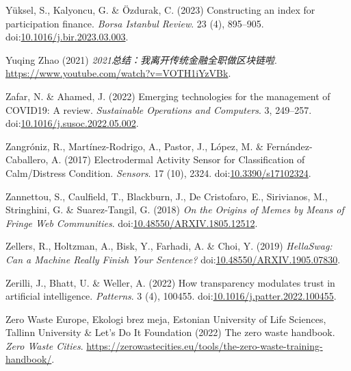 \documentclass[
  letterpaper,
  DIV=11,
  numbers=noendperiod]{scrartcl}
\newlength{\cslhangindent}
\newenvironment{CSLReferences}[2] %
 {\begin{list}{}{%
  \setlength{\itemindent}{0pt}
  \setlength{\leftmargin}{0pt}
  \setlength{\parsep}{0pt}
  \ifodd #1
   \setlength{\leftmargin}{\cslhangindent}
   \setlength{\itemindent}{-1\cslhangindent}
  \fi
  \setlength{\itemsep}{#2\baselineskip}}}
 {\end{list}}
\begin{document}
\begin{CSLReferences}{0}{1}
Yüksel, S., Kalyoncu, G. \& Özdurak, C. (2023) Constructing an index for
participation finance. \emph{Borsa Istanbul Review}. 23 (4), 895--905.
doi:\href{https://doi.org/10.1016/j.bir.2023.03.003}{10.1016/j.bir.2023.03.003}.

Yuqing Zhao (2021) \emph{2021总结：我离开传统金融全职做区块链啦}.
\url{https://www.youtube.com/watch?v=VOTH1iYzVBk}.

Zafar, N. \& Ahamed, J. (2022) Emerging technologies for the management
of {COVID19}: {A} review. \emph{Sustainable Operations and Computers}.
3, 249--257.
doi:\href{https://doi.org/10.1016/j.susoc.2022.05.002}{10.1016/j.susoc.2022.05.002}.

Zangróniz, R., Martínez-Rodrigo, A., Pastor, J., López, M. \&
Fernández-Caballero, A. (2017) Electrodermal {Activity Sensor} for
{Classification} of {Calm}/{Distress Condition}. \emph{Sensors}. 17
(10), 2324.
doi:\href{https://doi.org/10.3390/s17102324}{10.3390/s17102324}.

Zannettou, S., Caulfield, T., Blackburn, J., De Cristofaro, E.,
Sirivianos, M., Stringhini, G. \& Suarez-Tangil, G. (2018) \emph{On the
{Origins} of {Memes} by {Means} of {Fringe Web Communities}}.
doi:\href{https://doi.org/10.48550/ARXIV.1805.12512}{10.48550/ARXIV.1805.12512}.

Zellers, R., Holtzman, A., Bisk, Y., Farhadi, A. \& Choi, Y. (2019)
\emph{{HellaSwag}: {Can} a {Machine Really Finish Your Sentence}?}
doi:\href{https://doi.org/10.48550/ARXIV.1905.07830}{10.48550/ARXIV.1905.07830}.

Zerilli, J., Bhatt, U. \& Weller, A. (2022) How transparency modulates
trust in artificial intelligence. \emph{Patterns}. 3 (4), 100455.
doi:\href{https://doi.org/10.1016/j.patter.2022.100455}{10.1016/j.patter.2022.100455}.

Zero Waste Europe, Ekologi brez meja, Estonian University of Life
Sciences, Tallinn University \& Let's Do It Foundation (2022) The zero
waste handbook. \emph{Zero Waste Cities}.
\url{https://zerowastecities.eu/tools/the-zero-waste-training-handbook/}.


\end{CSLReferences}
\end{document}
